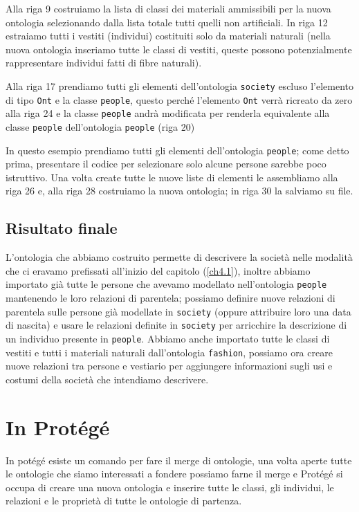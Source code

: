 Alla riga 9 costruiamo la lista di classi dei materiali ammissibili per la nuova ontologia selezionando dalla lista totale tutti quelli non artificiali. In riga 12 estraiamo tutti i vestiti (individui) costituiti solo da materiali naturali (nella nuova ontologia inseriamo tutte le classi di vestiti, queste possono potenzialmente rappresentare individui fatti di fibre naturali).

Alla riga 17 prendiamo tutti gli elementi dell'ontologia \verb|society| escluso l'elemento di tipo \verb|Ont| e la classe \verb|people|, questo perché l'elemento \verb|Ont| verrà ricreato da zero alla riga 24 e la classe \verb|people| andrà modificata per renderla equivalente alla classe \verb|people| dell'ontologia \verb|people| (riga 20)

In questo esempio prendiamo tutti gli elementi dell'ontologia \verb|people|; come detto prima, presentare il codice per selezionare solo alcune persone sarebbe poco istruttivo. Una volta create tutte le nuove liste di elementi le assembliamo alla riga 26 e, alla riga 28 costruiamo la nuova ontologia; in riga 30 la salviamo su file.
\subsection{Risultato finale}
L'ontologia che abbiamo costruito permette di descrivere la società nelle modalità che ci eravamo prefissati all'inizio del capitolo (\ref{ch4.1}), inoltre abbiamo importato già tutte le persone che avevamo modellato nell'ontologia \verb|people| mantenendo le loro relazioni di parentela; possiamo definire nuove relazioni di parentela sulle persone già modellate in \verb|society| (oppure attribuire loro una data di nascita) e usare le relazioni definite in \verb|society| per arricchire la descrizione di un individuo presente in \verb|people|. Abbiamo anche importato tutte le classi di vestiti e tutti i materiali naturali dall'ontologia \verb|fashion|, possiamo ora creare nuove relazioni tra persone e vestiario  per aggiungere informazioni sugli usi e costumi della società che intendiamo descrivere.
\section{In Protégé}
In potégé esiste un comando per fare il merge di ontologie, una volta aperte tutte le ontologie che siamo interessati a fondere possiamo farne il merge e Protégé si occupa di creare una nuova ontologia e inserire tutte le classi, gli individui, le relazioni e le proprietà di tutte le ontologie di partenza. 

